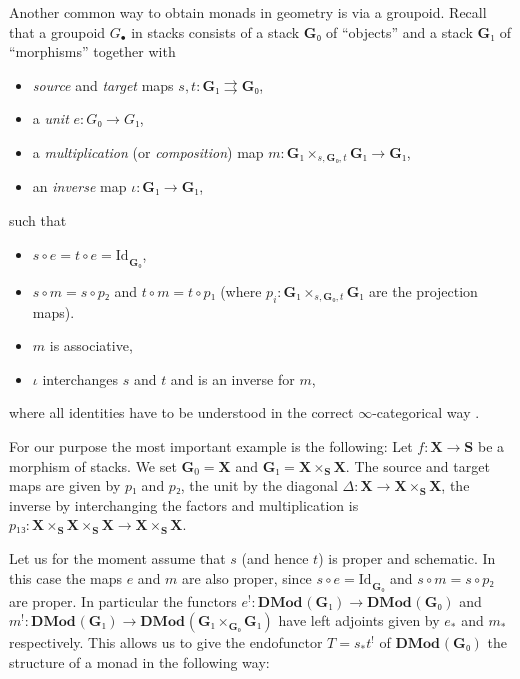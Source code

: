 \documentclass[english]{ck-article}
\newcommand\cat{\mathbf}
\newcommand\catDMod[2][]{\cat{DMod}_{#1}(#2)}
\newcommand\id[1][]{{\mathrm{Id}_{#1}}}
\let\stack\mathbf
\newcommand\cx\bullet
\newcommand\ΓdR{Γ_{\mkern-4mu\dR}}
\newcommand\Γsub[1]{\Gamma_{\mkern-3mu#1}}
\begin{document}
Another common way to obtain monads in geometry is via a groupoid.
Recall that a groupoid $G_{\cx}$ in stacks consists of a stack $\stack G₀$ of \enquote{objects} and a stack $\stack G₁$ of \enquote{morphisms} together with
\begin{itemize}
    \item \emph{source} and \emph{target} maps $s,t\colon \stack G₁ \rightrightarrows \stack G₀$,
    \item a \emph{unit} $e\colon G₀ → G₁$,
    \item a \emph{multiplication} (or \emph{composition}) map $m\colon \stack G₁ ×_{s,\stack G₀,t} \stack G₁ → \stack G₁$,
    \item an \emph{inverse} map $ι\colon \stack G₁ → \stack G₁$,
\end{itemize}
such that
\begin{itemize}
    \item $s ∘ e = t ∘ e = \id_{\stack G₀}$,
    \item $s ∘ m = s ∘ p₂$ and $t ∘ m = t ∘ p₁$ (where $p_i\colon \stack G₁ ×_{s,\stack G₀,t} \stack G₁$ are the projection maps).
    \item $m$ is associative,
    \item $ι$ interchanges $s$ and $t$ and is an inverse for $m$,
\end{itemize}
where all identities have to be understood in the correct $∞$-categorical way \cite[Section~6.1.2]{Lurie:2009:HigherToposTheory}.

\begin{Ex}
    For our purpose the most important example is the following:
    Let $f\colon \stack X → \stack S$ be a morphism of stacks.
    We set $\stack G_0 = \stack X$ and $\stack G₁ = \stack X ×_\stack S \stack X$.
    The source and target maps are given by $p₁$ and $p₂$, the unit by the diagonal $Δ\colon \stack X → \stack X×_\stack S\stack X$, the inverse by interchanging the factors and multiplication is $p₁₃\colon \stack X ×_\stack S \stack X ×_\stack S \stack X → \stack X×_\stack S\stack X$.
\end{Ex}

Let us for the moment assume that $s$ (and hence $t$) is proper and schematic.
In this case the maps $e$ and $m$ are also proper, since $s ∘ e = \id_{\stack G₀}$ and $s ∘ m = s ∘ p₂$ are proper.
In particular the functors $e^!\colon \catDMod{\stack G₁} → \catDMod{\stack G₀}$ and $m^!\colon \catDMod{\stack G₁} → \catDMod{\stack G₁ ×_{\stack G₀} \stack G₁}$ have left adjoints given by $e_*$ and $m_*$ respectively.
This allows us to give the endofunctor $T = s_*t^!$ of $\catDMod{\stack G₀}$ the structure of a monad in the following way:
\end{document}
